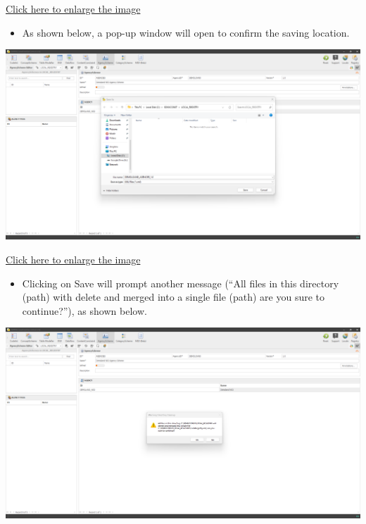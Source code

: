 \documentclass[
]{book}
\providecommand{\tightlist}{%
  \setlength{\itemsep}{0pt}\setlength{\parskip}{0pt}}
\begin{document}
\href{images/image072.png}{Click here to enlarge the image}

\begin{itemize}
\tightlist
\item
  As shown below, a pop-up window will open to confirm the saving location.
\end{itemize}

\begin{center}\includegraphics[width=1\linewidth]{./images/image074} \end{center}

\href{images/image074.png}{Click here to enlarge the image}

\begin{itemize}
\tightlist
\item
  Clicking on Save will prompt another message (``All files in this directory (path) with delete and merged into a single file (path) are you sure to continue?''), as shown below.
\end{itemize}

\begin{center}\includegraphics[width=1\linewidth]{./images/image076} \end{center}
\end{document}
